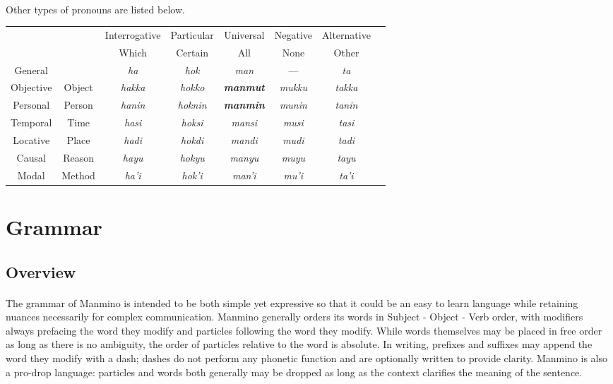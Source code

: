 \documentclass{book}
\begin{document}
    \paragraph{}
    Other types of pronouns are listed below. 
    \footnotesize \begin{center}
        \begin{tabular}{|c|c|c|c|c|c|c|c|}\hline
             \multicolumn{2}{|c|}{} &Interrogative & Particular & Universal & Negative & Alternative \\ \cline{3-7}
             \multicolumn{2}{|c|}{}& Which & Certain & All & None & Other \\ \hline
            General && \textit{ha} & \textit{hok} & \textit{man} & --- & \textit{ta} \\ \hline
            Objective &Object& \textit{hakka} & \textit{hokko} & \textbf{\textit{manmut}} & \textit{mukku} & \textit{takka} \\ \hline
             Personal &Person& \textit{hanin} & \textit{hoknin} & \textbf{\textit{manmin}} & \textit{munin} & \textit{tanin} \\ \hline
             Temporal &Time& \textit{hasi} & \textit{hoksi} & \textit{mansi} & \textit{musi} & \textit{tasi} \\ \hline
             Locative &Place& \textit{hadi} & \textit{hokdi} & \textit{mandi} & \textit{mudi} & \textit{tadi} \\ \hline
             Causal &Reason& \textit{hayu} & \textit{hokyu} & \textit{manyu} & \textit{muyu} & \textit{tayu} \\ \hline
             Modal &Method& \textit{ha'i} & \textit{hok'i} & \textit{man'i} & \textit{mu'i} & \textit{ta'i} \\ \hline
        \end{tabular}
    \end{center} 
    \normalsize
    \vfill\newpage
    \section{Grammar} 
        \subsection{Overview}
        \paragraph{}The grammar of Manmino is intended to be both simple yet expressive so that it could be an easy to learn language while retaining nuances necessarily for complex communication. Manmino generally orders its words in Subject - Object - Verb order, with modifiers always prefacing the word they modify and particles following the word they modify. While words themselves may be placed in free order as long as there is no ambiguity, the order of particles relative to the word is absolute. In writing, prefixes and suffixes may append the word they modify with a dash; dashes do not perform any phonetic function and are optionally written to provide clarity. Manmino is also a pro-drop language: particles and words both generally may be dropped as long as the context clarifies the meaning of the sentence. 
\end{document}
